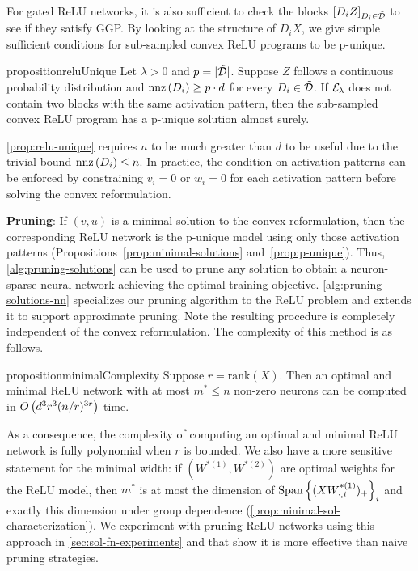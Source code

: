 For gated ReLU networks, it is also sufficient to check the blocks
\( \left[D_i Z\right]_{D_i \in \tilde {\mathcal{D}}} \) to see if they satisfy GGP.
By looking at the structure of \( D_i X \),
we give simple sufficient conditions for sub-sampled
convex ReLU programs to be p-unique.

\begin{restatable}{proposition}{reluUnique}\label{prop:relu-unique}
    Let \( \lambda > 0 \) and \( p = |\tilde {\mathcal{D}}| \).
    Suppose \( Z \) follows a continuous probability distribution
    and \( \text{nnz}\,(D_i) \geq p \cdot d \) for every \( D_i \in \tilde {\mathcal{D}} \).
    If \( {\mathcal{E}_{\lambda}} \) does not contain two blocks with the same
    activation pattern, then
    the sub-sampled convex ReLU program has a p-unique solution
    almost surely.
\end{restatable}

\cref{prop:relu-unique} requires \( n \) to be much greater than
\( d \) to be useful due to the trivial bound \( \text{nnz}\,(D_i) \leq n \).
In practice, the condition on activation patterns can be enforced by
constraining \( v_i = 0 \) or \( w_i = 0 \) for each
activation pattern before solving the convex reformulation.

\textbf{Pruning}:
If \( (v, u) \) is a minimal solution to the convex reformulation, then the
corresponding ReLU network is the p-unique model using only those
activation patterns (Propositions~\ref{prop:minimal-solutions} and~\ref{prop:p-unique}).
Thus, \cref{alg:pruning-solutions} can be used to prune
any solution to obtain a neuron-sparse neural network
achieving the optimal training objective.
\cref{alg:pruning-solutions-nn} specializes our pruning algorithm
to the ReLU problem and extends it to support approximate pruning.
Note the resulting procedure is completely independent of the convex
reformulation.
The complexity of this method is as follows.

\begin{restatable}{proposition}{minimalComplexity}\label{prop:minimal-complexity}
    Suppose \( r = \text{rank}(X) \).
    Then an optimal and minimal ReLU network with at most
    \( m^* \leq n \) non-zero neurons can be computed in
    \( O\left(d^3 r^3 (n/r)^{3r}\right) \)
    time.
\end{restatable}

As a consequence, the complexity of computing
an optimal and minimal ReLU network is fully polynomial when \( r \)
is bounded.
We also have a more sensitive statement for the minimal width: if
\( (W^{*(1)}, W^{*(2)}) \) are optimal weights for the ReLU model, then
\( m^* \) is at most the dimension of
\( \text{Span} \left\{(X W^{*(1)}_{\cdot, i})_+\right\}_i \)
and exactly this dimension under group dependence
(\cref{prop:minimal-sol-characterization}).
We experiment with pruning ReLU networks using this approach in
\cref{sec:sol-fn-experiments} and that show it
is more effective than naive pruning strategies.

